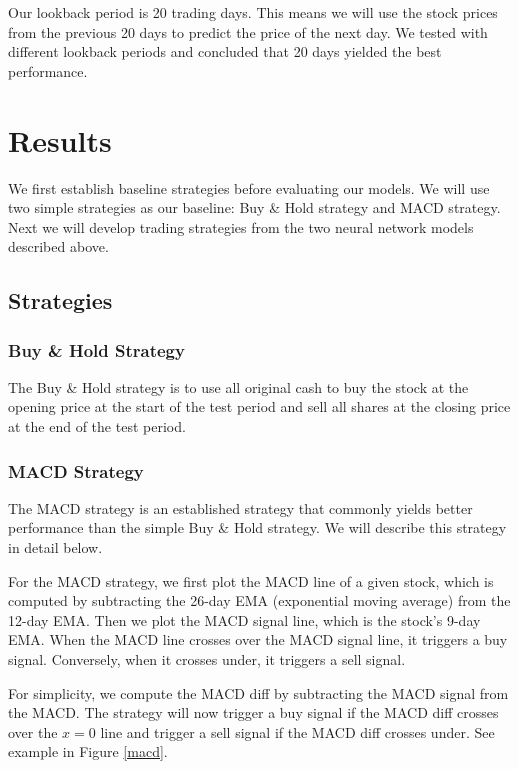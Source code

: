 \documentclass[10pt]{article}
\begin{document}
Our lookback period is 20 trading days. This means we will use the stock prices from the previous 20 days to predict the price of the next day. We tested with different lookback periods and concluded that 20 days yielded the best performance.



\section{Results}

We first establish baseline strategies before evaluating our models. We will use two simple strategies as our baseline: Buy \& Hold strategy and MACD strategy. Next we will develop trading strategies from the two neural network models described above.

\subsection{Strategies}

\subsubsection{Buy \& Hold Strategy}

The Buy \& Hold strategy is to use all original cash to buy the stock at the opening price at the start of the test period and sell all shares at the closing price at the end of the test period.


\subsubsection{MACD Strategy}

The MACD strategy is an established strategy that commonly yields better performance than the simple Buy \& Hold strategy. We will describe this strategy in detail below.

For the MACD strategy, we first plot the MACD line of a given stock, which is computed by subtracting the 26-day EMA (exponential moving average) from the 12-day EMA. Then we plot the MACD signal line, which is the stock's 9-day EMA. When the MACD line crosses over the MACD signal line, it triggers a buy signal. Conversely, when it crosses under, it triggers a sell signal.

For simplicity, we compute the MACD diff by subtracting the MACD signal from the MACD. The strategy will now trigger a buy signal if the MACD diff crosses over the $x=0$ line and trigger a sell signal if the MACD diff crosses under. See example in Figure \ref{macd}.
\end{document}
